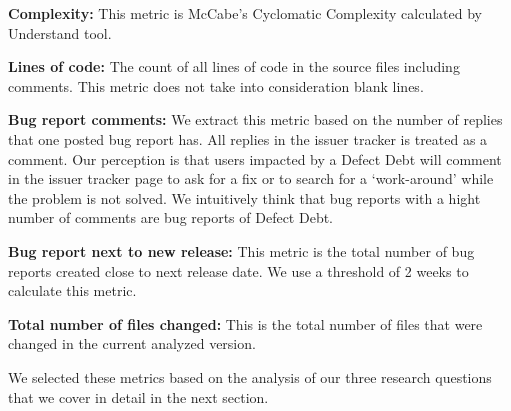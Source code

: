 \textbf{Complexity:} This metric is McCabe's Cyclomatic Complexity \cite{mccabeTSE1976} calculated by Understand tool.

\textbf{Lines of code:} The count of all lines of code in the source files including comments. This metric does not take into consideration blank lines.

\textbf{Bug report comments:} We extract this metric based on the number of replies that one posted bug report has. All replies in the issuer tracker is treated as a comment. Our perception is that users impacted by a Defect Debt will comment in the issuer tracker page to ask for a fix or to search for a `work-around' while the problem is not solved. We intuitively think that bug reports with a hight number of comments are bug reports of Defect Debt.

\textbf{Bug report next to new release:} This metric is the total number of bug reports created close to next release date. We use a threshold of 2 weeks to calculate this metric.  

\textbf{Total number of files changed:} This is the total number of files that were changed in the current analyzed version. 

 We selected these metrics based on the analysis of our three research questions that we cover in detail in the next section.

